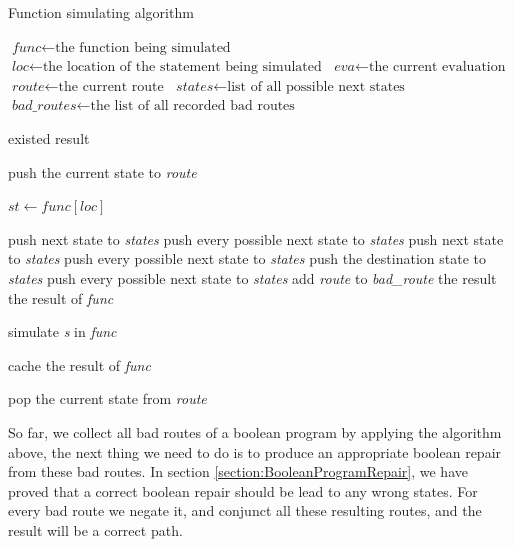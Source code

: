 \begin{algorithm}
\caption{Function simulating algorithm}
\begin{algorithmic}[1]

\STATE $\textit{func} \gets \text{the function being simulated}$
\STATE $\textit{loc} \gets \text{the location of the statement being simulated}$
\STATE $\textit{eva} \gets \text{the current evaluation}$
\STATE $\textit{route} \gets \text{the current route}$
\STATE $\textit{states} \gets \text{list of all possible next states}$
\STATE $\textit{bad\_routes} \gets \text{the list of all recorded bad routes}$
\STATE

    \RETURN existed result
  \ENDIF
\ENDIF

\STATE
\STATE push the current state to \textit{route}

\STATE
\STATE $\textit{st} \gets \textit{func}[\textit{loc}]$

    \STATE push next state to \textit{states}
  \ELSE
    \STATE push every possible next state to \textit{states}
  \ENDIF
{}
    \STATE push next state to \textit{states}
  \ELSE
    \STATE push every possible next state to \textit{states}
  \ENDIF
{}
  \STATE push the destination state to \textit{states}
  \STATE push every possible next state to \textit{states}
      \STATE add \textit{route} to \textit{bad\_route}
      \RETURN the result
    \ENDIF
  \ENDIF
\ELSE
    \RETURN the result of \textit{func}
  \ENDIF
\ENDIF

\STATE
{}
  \STATE simulate \textit{s} in \textit{func}
\ENDFOR

\STATE
{}
  \STATE cache the result of \textit{func}
\ENDIF

\STATE
\STATE pop the current state from \textit{route}
\end{algorithmic}
\end{algorithm}

So far, we collect all bad routes of a boolean program by applying the algorithm above, the next thing we need to do is to produce an appropriate boolean repair from these bad routes.
In section \ref{section:BooleanProgramRepair}, we have proved that a correct boolean repair should be lead to any wrong states.
For every bad route we negate it, and conjunct all these resulting routes, and the result will be a correct path.

